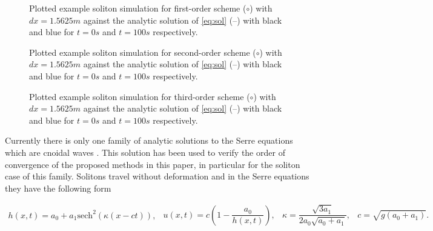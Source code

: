 \documentclass[SingleSpace,12pt]{Serre_ASCE}
\begin{document}
\begin{figure}[htb]
\centering
{}
\caption{Plotted example soliton simulation for first-order scheme ($\circ$) with $dx = 1.5625m$ against the analytic solution of \eqref{eq:sol} (\---) with black and blue for $t =0s$ and $t=100s$ respectively.}
\label{fig:solitoneo1}
\end{figure}
\begin{figure}[htb]
\centering
{}
\caption{Plotted example soliton simulation for second-order scheme ($\circ$) with $dx = 1.5625m$ against the analytic solution of \eqref{eq:sol} (\---) with black and blue for $t =0s$ and $t=100s$ respectively.}
\label{fig:solitoneo2}
\end{figure}
\begin{figure}[htb]
\centering
{}
\caption{Plotted example soliton simulation for third-order scheme ($\circ$) with $dx = 1.5625m$ against the analytic solution of \eqref{eq:sol} (\---) with black and blue for $t =0s$ and $t=100s$ respectively.}
\label{fig:solitoneo3}
\end{figure}
Currently there is only one family of analytic solutions to the Serre equations which are cnoidal waves \cite{Carter-Cienfuegos-2010-259}. This solution has been used to verify the order of convergence of the proposed methods in this paper, in particular for the soliton case of this family. Solitons travel without deformation and in the Serre equations they have the following form
\begin{linenomath*}
\begin{subequations}
\begin{gather}\label{eq:sol1}
h\left(x,t\right) = a_0 + a_1\text{sech}^2\left( \kappa\left(x - ct\right)\right),
\end{gather}
\begin{gather}\label{eq:sol2}
u\left(x,t\right) = c\left(1 - \dfrac{a_0}{h(x,t)} \right),
\end{gather}
\begin{gather}\label{eq:sol3}
\kappa = \dfrac{\sqrt{3a_1}}{2a_0 \sqrt{ a_0 + a_1}},
\end{gather}
\begin{gather}\label{eq:sol4}
c = \sqrt{g \left(a_0 + a_1\right)}.
\end{gather}
\end{subequations}
\label{eq:sol}
\end{linenomath*}
\end{document}
